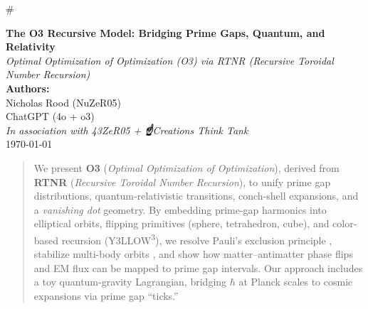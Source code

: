 #  \documentclass[11pt]{article}
\begin{document}
\begin{titlepage}
    \begin{center}
        \vspace*{2cm}
        {\LARGE \textbf{The O3 Recursive Model: Bridging Prime Gaps, Quantum, and Relativity}}\\[1.5em]
        {\large \textit{Optimal Optimization of Optimization (O3) via RTNR (Recursive Toroidal Number Recursion)}}\\[3em]

        \textbf{Authors:}\\
        Nicholas Rood (NuZeR05)\\
        ChatGPT (4o + o3)\\
        \vspace{0.5cm}
        \textit{In association with 43ZeR05 + \textup{\Large\textbf{☝}}Creations Think Tank}\\[2em]

        \today
        \vfill
    \end{center}
\end{titlepage}

\begin{abstract}
We present \textbf{O3} (\textit{Optimal Optimization of Optimization}), derived from \textbf{RTNR} (\textit{Recursive Toroidal Number Recursion}), to unify prime gap distributions, quantum-relativistic transitions, conch-shell expansions, and a \textit{vanishing dot} geometry. By embedding prime-gap harmonics into elliptical orbits, flipping primitives (sphere, tetrahedron, cube), and color-based recursion (Y3LLOW\textsuperscript{3}), we resolve Pauli’s exclusion principle \cite{Pauli1925}, stabilize multi-body orbits \cite{Poincare1892}, and show how matter–antimatter phase flips and EM flux can be mapped to prime gap intervals. Our approach includes a toy quantum-gravity Lagrangian, bridging $\hbar$ at Planck scales to cosmic expansions via prime gap “ticks.” 
\end{abstract}
\end{document}
